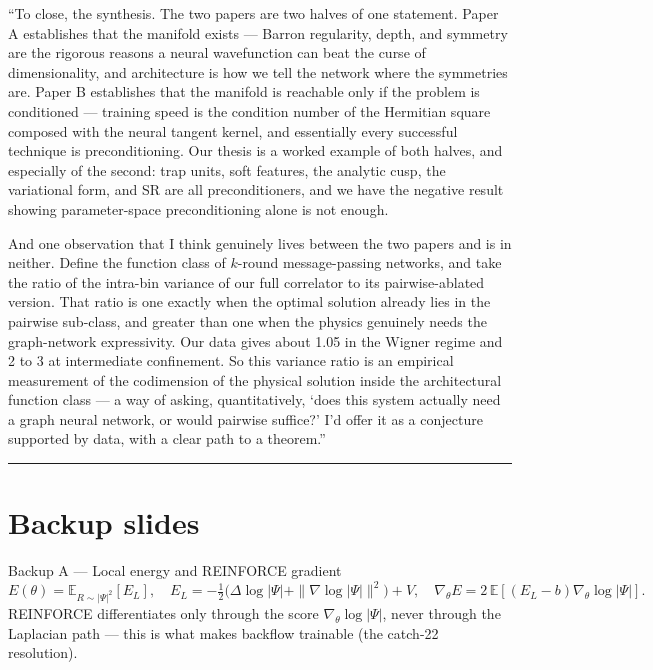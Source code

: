 \documentclass[11pt]{article}
\begin{document}
\begin{say}
``To close, the synthesis. The two papers are two halves of one statement. Paper A establishes that
the manifold exists --- Barron regularity, depth, and symmetry are the rigorous reasons a neural
wavefunction can beat the curse of dimensionality, and architecture is how we tell the network where
the symmetries are. Paper B establishes that the manifold is reachable only if the problem is
conditioned --- training speed is the condition number of the Hermitian square composed with the
neural tangent kernel, and essentially every successful technique is preconditioning. Our thesis is a
worked example of both halves, and especially of the second: trap units, soft features, the analytic
cusp, the variational form, and SR are all preconditioners, and we have the negative result showing
parameter-space preconditioning alone is not enough.

And one observation that I think genuinely lives between the two papers and is in neither. Define the
function class of $k$-round message-passing networks, and take the ratio of the intra-bin variance of
our full correlator to its pairwise-ablated version. That ratio is one exactly when the optimal
solution already lies in the pairwise sub-class, and greater than one when the physics genuinely needs
the graph-network expressivity. Our data gives about 1.05 in the Wigner regime and 2 to 3 at
intermediate confinement. So this variance ratio is an empirical measurement of the codimension of the
physical solution inside the architectural function class --- a way of asking, quantitatively, `does
this system actually need a graph neural network, or would pairwise suffice?' I'd offer it as a
conjecture supported by data, with a clear path to a theorem.''
\end{say}

\vspace{1em}\hrule\vspace{1em}

\section*{Backup slides}

\begin{slide}{Backup A --- Local energy and REINFORCE gradient}
\[
E(\theta)=\mathbb E_{R\sim|\Psi|^2}[E_L],\quad
E_L=-\tfrac12\big(\Delta\log|\Psi|+\|\nabla\log|\Psi|\|^2\big)+V,\quad
\nabla_\theta E=2\,\mathbb E[(E_L-b)\nabla_\theta\log|\Psi|].
\]
REINFORCE differentiates only through the score $\nabla_\theta\log|\Psi|$, never through the Laplacian
path --- this is what makes backflow trainable (the catch-22 resolution).
\end{slide}
\end{document}
